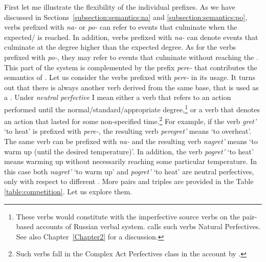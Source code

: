 First let me illustrate the flexibility of the individual prefixes. As we have discussed in Sections~\ref{subsection:semantics:na} and \ref{subsection:semantics:po}, verbs prefixed with \textit{na-} or \textit{po-} can refer to events that culminate when the expected/ is reached. In addition, verbs prefixed with \textit{na-} can denote events that culminate at the degree higher than the expected degree. As for the verbs prefixed with \textit{po-}, they may refer to events that culminate without reaching the . This part of the  system is complemented by the prefix \textit{pere-} that contributes the semantics of . Let us consider the verbs prefixed with \textit{pere-} in its  usage. It turns out that there is always another verb derived from the same base, that is used as a . Under \textit{neutral perfective} I mean either a verb that refers to an action performed until the normal/standard/appropriate degree,\footnote{These verbs would constitute  with the imperfective source verbs on the pair-based accounts of Russian verbal system. \citet{Janda:07a} calls such verbs Natural Perfectives. See also Chapter~\ref{Chapter2} for a discussion.} or a verb that denotes an action that lasted for some non-specified time.\footnote{Such verbs fall in the Complex Act Perfectives class in the account by \citet{Janda:07a}.} For example, if the verb \textit{gret'} `to heat' is prefixed with \textit{pere-}, the resulting verb \textit{peregret'} means `to overheat'. The same verb can be prefixed with \textit{na-} and the resulting verb \textit{nagret'} means `to warm up (until the desired temperature)'. In addition, the verb \textit{pogret'} `to heat' means warming up without necessarily reaching some particular temperature. In this case both \textit{nagret'} `to warm up'  and \textit{pogret'} `to heat' are neutral perfectives, only with respect to different . More pairs and triples are provided in the Table \ref{table:competition}. Let us explore them. 

